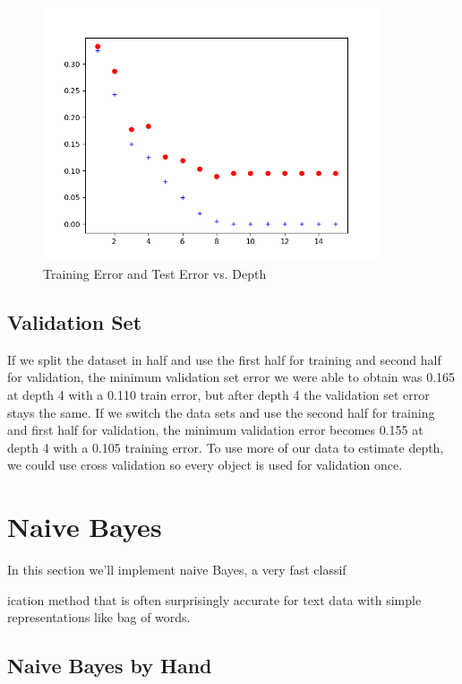 \documentclass{article}
\begin{document}
\begin{figure}[h!]
  \includegraphics[height=7.5cm]{Etrain_Etest_vs_depth.png}
  \caption{Training Error and Test Error vs. Depth}
  \label{fig: error vs depth}
\end{figure}


\subsection{Validation Set}

If we split the dataset in half and use the first half for training and second half for validation, the minimum validation set error we were able to obtain was 0.165 at depth 4 with a 0.110 train error, but after depth 4 the validation set error stays the same. If we switch the data sets and use the second half for training and first half for validation, the minimum validation error becomes 0.155 at depth 4 with a 0.105 training error. To use more of our data to estimate depth, we could use cross validation so every object is used for validation once.

\section{Naive Bayes}

In this section we'll implement naive Bayes, a very fast classif

ication method that is often surprisingly accurate for text data with simple representations like bag of words.



\subsection{Naive Bayes by Hand}
\end{document}
